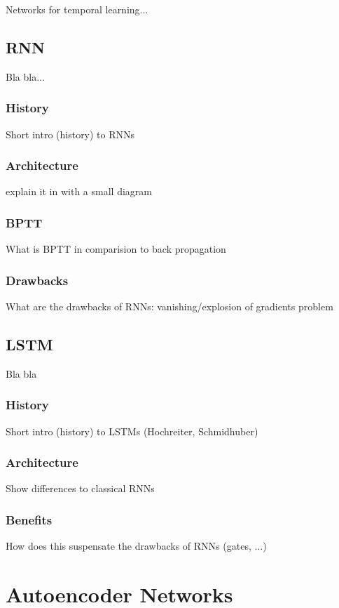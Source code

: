 Networks for temporal learning...

\subsection{RNN}

Bla bla...

\subsubsection{History}
Short intro (history) to RNNs

\subsubsection{Architecture}
explain it in with a small diagram

\subsubsection{BPTT}
What is BPTT in comparision to back propagation

\subsubsection{Drawbacks}
What are the drawbacks of RNNs: vanishing/explosion of gradients problem

\subsection{LSTM}

Bla bla

\subsubsection{History}
Short intro (history) to LSTMs (Hochreiter, Schmidhuber)

\subsubsection{Architecture}
Show differences to classical RNNs

\subsubsection{Benefits}
How does this suspensate the drawbacks of RNNs (gates, ...)


\section{Autoencoder Networks}

